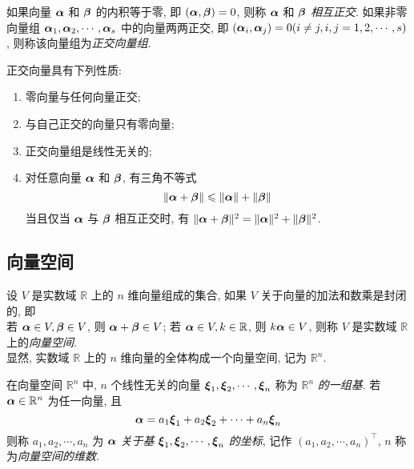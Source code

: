 \begin{definition}[向量的正交]
    如果向量 $ \vb*{\alpha} $ 和 $ \vb*{\beta} $ 的内积等于零, 即 $ (\vb*{\alpha}, \vb*{\beta})=0 $, 则称  $\vb*{\alpha} $ 和 $ \vb*{\beta} $ \textit{相互正交}. 如果非零向量组 $ \vb*{\alpha}_{1}, \vb*{\alpha}_{2}, \cdots, \vb*{\alpha}_{s} $ 中的向量两两正交, 即 $ \left(\vb*{\alpha}_{i}, \vb*{\alpha}_{j}\right)=0(i \neq j, i, j=1 ,  2, \cdots, s) $, 则称该向量组为\textit{正交向量组}.
\end{definition}

正交向量具有下列性质:
\begin{enumerate}[label=(\arabic{*})]
    \item 零向量与任何向量正交;
    \item 与自己正交的向量只有零向量;
    \item 正交向量组是线性无关的;
    \item 对任意向量 $ \vb*{\alpha} $ 和 $ \vb*{\beta} $, 有三角不等式
          $$\|\vb*{\alpha}+\vb*{\beta}\| \leqslant\|\vb*{\alpha}\|+\|\vb*{\beta}\|$$
          当且仅当 $ \vb*{\alpha} $ 与 $ \vb*{\beta} $ 相互正交时, 有 $ \|\vb*{\alpha}+\vb*{\beta}\|^{2}=\|\vb*{\alpha}\|^{2}+\|\vb*{\beta}\|^{2} $.
\end{enumerate}

\subsection{向量空间}

\begin{definition}[向量空间]
    设 $ V $ 是实数域 $ \mathbb{R} $ 上的 $ n $ 维向量组成的集合, 如果 $ V $ 关于向量的加法和数乘是封闭的, 即\\
    若 $ \vb*{\alpha} \in V, \vb*{\beta} \in V $, 则 $ \vb*{\alpha}+\vb*{\beta} \in V $; 若 $ \vb*{\alpha} \in V, k \in \mathbb{R} $, 则 $ k \vb*{\alpha} \in V $, 则称 $ V $ 是实数域 $ \mathbb{R} $ 上的\textit{向量空间}.\\
    显然, 实数域 $ \mathbb{R} $ 上的 $ n $ 维向量的全体构成一个向量空间, 记为 $ \mathbb{R}^{n} $.
\end{definition}

\begin{definition}[基与维数]
    在向量空间 $ \mathbb{R}^{n} $ 中, $ n $ 个线性无关的向量 $ \vb*{\xi}_{1}, \vb*{\xi}_{2}, \cdots, \vb*{\xi}_{n} $ 称为 $ \mathbb{R}^{n} $ \textit{的一组基}. 若 $ \vb*{\alpha} \in \mathbb{R}^{n} $ 为任一向量, 且
    $$\vb*{\alpha}=a_{1} \vb*{\xi}_{1}+a_{2} \vb*{\xi}_{2}+\cdots+a_{n} \vb*{\xi}_{n}$$
    则称 $ a_{1}, a_{2}, \cdots, a_{n} $ 为 $ \vb*{\alpha} $ \textit{关于基} $ \vb*{\xi}_{1}, \vb*{\xi}_{2}, \cdots, \vb*{\xi}_{n} $ \textit{的坐标}, 记作 $ \left(a_{1}, a_{2}, \cdots, a_{n}\right)^{\top} $, $n$ 称为\textit{向量空间的维数}.
\end{definition}

